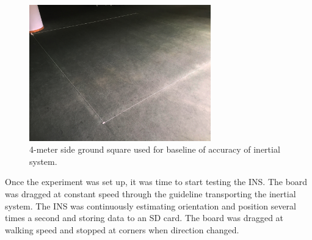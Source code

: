 \begin{figure}[!h]
    \centering
    \includegraphics[width=0.7\textwidth]{figures/indoor.jpg}
    \caption{4-meter side ground square used for baseline of accuracy of inertial system.}
    \label{fig:indoor_square}
\end{figure}

Once the experiment was set up, it was time to start testing the INS. The board was dragged at constant speed through the guideline transporting the inertial system. The INS was continuously estimating orientation and position several times a second and storing data to an SD card. The board was dragged at walking speed and stopped at corners when direction changed.

